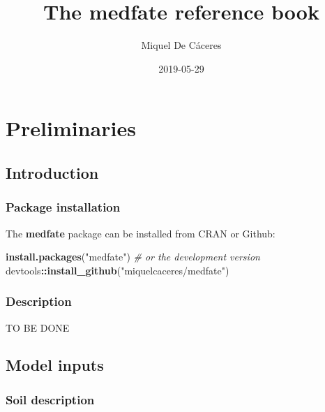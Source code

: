 \documentclass[]{book}
\title{The medfate reference book}
\author{Miquel De Cáceres}
\date{2019-05-29}
\newenvironment{Shaded}{\begin{snugshade}}{\end{snugshade}}
\newcommand{\KeywordTok}[1]{\textcolor[rgb]{0.13,0.29,0.53}{\textbf{#1}}}
\newcommand{\StringTok}[1]{\textcolor[rgb]{0.31,0.60,0.02}{#1}}
\newcommand{\CommentTok}[1]{\textcolor[rgb]{0.56,0.35,0.01}{\textit{#1}}}
\newcommand{\OperatorTok}[1]{\textcolor[rgb]{0.81,0.36,0.00}{\textbf{#1}}}
\newcommand{\NormalTok}[1]{#1}
\begin{document}
\maketitle

{
\setcounter{tocdepth}{1}
\tableofcontents
}
\hypertarget{part-preliminaries}{%
\part{Preliminaries}\label{part-preliminaries}}

\hypertarget{intro}{%
\chapter{Introduction}\label{intro}}

\hypertarget{package-installation}{%
\section{Package installation}\label{package-installation}}

The \textbf{medfate} package can be installed from CRAN or Github:

\begin{Shaded}
\begin{Highlighting}[]
\KeywordTok{install.packages}\NormalTok{(}\StringTok{"medfate"}\NormalTok{)}
\CommentTok{# or the development version}
\NormalTok{devtools}\OperatorTok{::}\KeywordTok{install_github}\NormalTok{(}\StringTok{"miquelcaceres/medfate"}\NormalTok{)}
\end{Highlighting}
\end{Shaded}

\hypertarget{description}{%
\section{Description}\label{description}}

TO BE DONE

\hypertarget{model-inputs}{%
\chapter{Model inputs}\label{model-inputs}}

\hypertarget{soil-description}{%
\section{Soil description}\label{soil-description}}
\end{document}
